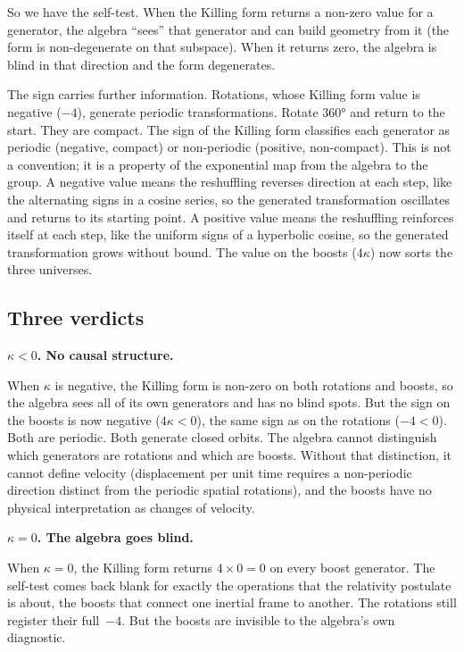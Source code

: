\documentclass[11pt]{article}
\begin{document}
So we have the self-test. When the Killing form returns a non-zero value for a generator, the algebra ``sees'' that generator and can build geometry from it (the form is non-degenerate on that subspace). When it returns zero, the algebra is blind in that direction and the form degenerates.

The sign carries further information. Rotations, whose Killing form value is negative ($-4$), generate periodic transformations. Rotate $360°$ and return to the start. They are compact. The sign of the Killing form classifies each generator as periodic (negative, compact) or non-periodic (positive, non-compact). This is not a convention; it is a property of the exponential map from the algebra to the group. A negative value means the reshuffling reverses direction at each step, like the alternating signs in a cosine series, so the generated transformation oscillates and returns to its starting point. A positive value means the reshuffling reinforces itself at each step, like the uniform signs of a hyperbolic cosine, so the generated transformation grows without bound. The value on the boosts ($4\kappa$) now sorts the three universes.


\subsection*{Three verdicts}

\textbf{$\kappa < 0$. No causal structure.}

\smallskip
When $\kappa$ is negative, the Killing form is non-zero on both rotations and boosts, so the algebra sees all of its own generators and has no blind spots. But the sign on the boosts is now negative ($4\kappa < 0$), the same sign as on the rotations ($-4 < 0$). Both are periodic. Both generate closed orbits. The algebra cannot distinguish which generators are rotations and which are boosts. Without that distinction, it cannot define velocity (displacement per unit time requires a non-periodic direction distinct from the periodic spatial rotations), and the boosts have no physical interpretation as changes of velocity.

\bigskip
\textbf{$\kappa = 0$. The algebra goes blind.}

\smallskip
When $\kappa = 0$, the Killing form returns $4 \times 0 = 0$ on every boost generator. The self-test comes back blank for exactly the operations that the relativity postulate is about, the boosts that connect one inertial frame to another. The rotations still register their full~$-4$. But the boosts are invisible to the algebra's own diagnostic.
\end{document}
